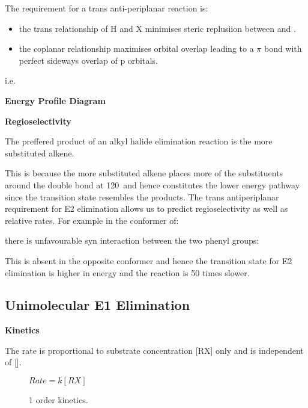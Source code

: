 
The requirement for a trans anti-periplanar reaction is:


\begin{itemize}
  \item the trans relationship of H and X minimises steric replusiion between
     and .
  \item the coplanar relationship maximises orbital overlap leading to a
    $\pi$ bond with perfect sideways overlap of p orbitals.
\end{itemize}

i.e.


\textbf{Energy Profile Diagram}


\textbf{Regioselectivity}

The preffered product of an alkyl halide elimination reaction is the more
substituted alkene.


This is because the more substituted alkene places more of the substituents
around the double bond at 120\de\ and hence constitutes the lower energy
pathway since the transition state resembles the products.
The trans antiperiplanar requirement for E2 elimination allows us to predict
regioselectivity as well as relative rates. For example in the
conformer of:


there is unfavourable syn interaction between the two phenyl groups:


This is absent in the opposite conformer and hence the transition state for E2
elimination is higher in energy and the reaction is 50 times slower.

\subsection{Unimolecular E1 Elimination}


\textbf{Kinetics}

The rate is proportional to substrate concentration [RX] only and is independent
of [].

\begin{figure}[H]
  \centering
  $Rate = k[RX]$
  \caption*{1 order kinetics.}
\end{figure}


